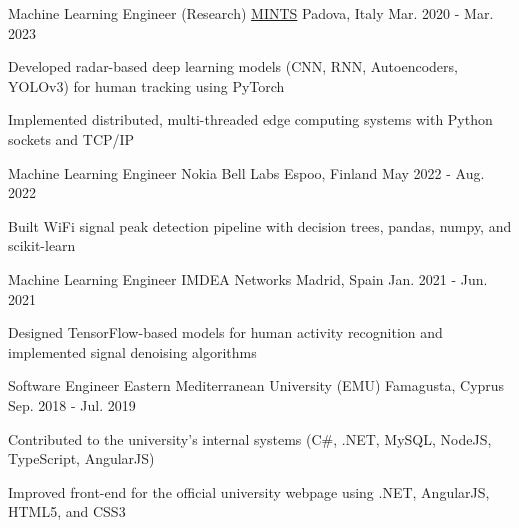 \begin{cventries}
  \cventry
    {Machine Learning Engineer (Research)} %
    {\href{https://b5g-mints.eu/}{MINTS}} %
    {Padova, Italy} %
    {Mar. 2020 - Mar. 2023} %
    {
      \begin{cvitems}
        \item {Developed radar-based deep learning models (CNN, RNN, Autoencoders, YOLOv3) for human tracking using PyTorch}
        \item {Implemented distributed, multi-threaded edge computing systems with Python sockets and TCP/IP}
      \end{cvitems}
    }

  \cventry
    {Machine Learning Engineer} %
    {Nokia Bell Labs} %
    {Espoo, Finland} %
    {May 2022 - Aug. 2022} %
    {
      \begin{cvitems}
        \item {Built WiFi signal peak detection pipeline with decision trees, pandas, numpy, and scikit-learn}
      \end{cvitems}
    }

  \cventry
    {Machine Learning Engineer} %
    {IMDEA Networks} %
    {Madrid, Spain} %
    {Jan. 2021 - Jun. 2021} %
    {
      \begin{cvitems}
        \item {Designed TensorFlow-based models for human activity recognition and implemented signal denoising algorithms}
      \end{cvitems}
    }

  \cventry
    {Software Engineer} %
    {Eastern Mediterranean University (EMU)} %
    {Famagusta, Cyprus} %
    {Sep. 2018 - Jul. 2019} %
    {
      \begin{cvitems}
        \item {Contributed to the university’s internal systems (C\#, .NET, MySQL, NodeJS, TypeScript, AngularJS)}
        \item {Improved front-end for the official university webpage using .NET, AngularJS, HTML5, and CSS3}
      \end{cvitems}
    }

\end{cventries}
